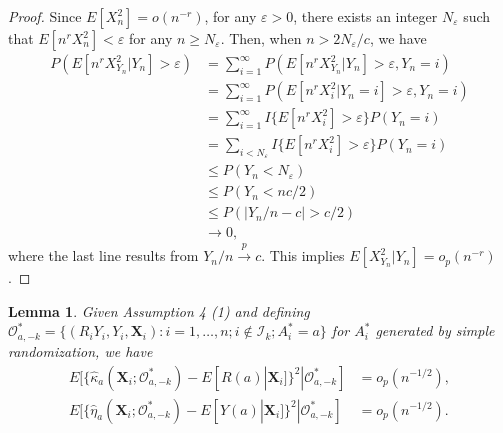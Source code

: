 \documentclass[12pt]{article}
\newtheorem{lemma}{Lemma}
\newcommand{\bX}{\boldsymbol{X}}
\begin{document}
\begin{proof}
Since  $E[X_n^2] = o(n^{-r})$, for any $\varepsilon >0$, there exists an integer $N_{\varepsilon}$ such that $E[n^r X_n^2] < \varepsilon$ for any $n \ge N_{\varepsilon}$. Then, when $n > 2N_{\varepsilon}/c$, we have
\begin{align*}
    P(E[n^rX_{Y_n}^2|Y_n] > \varepsilon) &= \sum_{i=1}^{\infty} P(E[n^rX_{Y_n}^2|Y_n] > \varepsilon, Y_n = i) \\
    &= \sum_{i=1}^{\infty} P(E[n^rX_i^2|Y_n=i] > \varepsilon, Y_n = i) \\
    &= \sum_{i=1}^{\infty} I\{E[n^rX_i^2] > \varepsilon\} P(Y_n = i) \\
    &= \sum_{i < N_{\varepsilon}} I\{E[n^rX_i^2] > \varepsilon\} P(Y_n = i) \\
    &\le P(Y_n < N_{\varepsilon}) \\
    &\le P(Y_n < nc/2) \\
    &\le P(|Y_n/n - c| > c/2) \\
    &\rightarrow 0,
\end{align*}
where the last line results from $Y_n/n \xrightarrow{p} c$. This implies $E[X_{Y_n}^2|Y_n] = o_p(n^{-r})$.
\end{proof}

\begin{lemma}\label{lemma: O_a-k}
Given Assumption 4 (1) and defining $\mathcal{O}_{a,-k}^* = \{(R_iY_i,Y_i,\bX_i): i = 1,\dots, n;i \notin \mathcal{I}_k; A_i^* =a\}$ for $A_i^*$ generated by simple randomization, we have
\begin{align*}
    E[\{\widehat{\kappa}_a(\bX_i;\mathcal{O}_{a,-k}^*) - E[R(a)|\bX_i]\}^2|\mathcal{O}^*_{a, -k}] &= o_p(n^{-1/2}),\\
    E[\{\widehat{\eta}_a(\bX_i;\mathcal{O}_{a,-k}^*) - E[Y(a)|\bX_i]\}^2|\mathcal{O}^*_{a, -k}] &= o_p(n^{-1/2}).
\end{align*}
\end{lemma}
\end{document}
